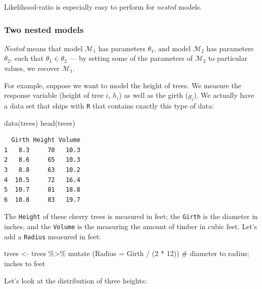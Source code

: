 \documentclass[
  letterpaper,
  DIV=11,
  numbers=noendperiod]{scrreprt}
\newenvironment{Shaded}{\begin{snugshade}}{\end{snugshade}}
\newcommand{\AttributeTok}[1]{\textcolor[rgb]{0.40,0.45,0.13}{#1}}
\newcommand{\CommentTok}[1]{\textcolor[rgb]{0.37,0.37,0.37}{#1}}
\newcommand{\DecValTok}[1]{\textcolor[rgb]{0.68,0.00,0.00}{#1}}
\newcommand{\FunctionTok}[1]{\textcolor[rgb]{0.28,0.35,0.67}{#1}}
\newcommand{\NormalTok}[1]{\textcolor[rgb]{0.00,0.23,0.31}{#1}}
\newcommand{\OtherTok}[1]{\textcolor[rgb]{0.00,0.23,0.31}{#1}}
\newcommand{\SpecialCharTok}[1]{\textcolor[rgb]{0.37,0.37,0.37}{#1}}
\begin{document}
Likelihood-ratio is especially easy to perform for \emph{nested} models.

\hypertarget{two-nested-models}{%
\subsubsection{Two nested models}\label{two-nested-models}}

\emph{Nested} means that model \(\mathcal M_1\) has parameters
\(\theta_1\), and model \(\mathcal M_2\) has parameters \(\theta_2\),
such that \(\theta_1 \in \theta_2\) --- by setting some of the
parameters of \(\mathcal M_2\) to particular values, we recover
\(\mathcal M_1\).

For example, suppose we want to model the height of trees. We measure
the response variable (height of tree \(i\), \(h_i\)) as well as the
girth (\(g_i\)). We actually have a data set that ships with \texttt{R}
that contains exactly this type of data:

\begin{Shaded}
\begin{Highlighting}[]
\FunctionTok{data}\NormalTok{(trees)}
\FunctionTok{head}\NormalTok{(trees)}
\end{Highlighting}
\end{Shaded}

\begin{verbatim}
  Girth Height Volume
1   8.3     70   10.3
2   8.6     65   10.3
3   8.8     63   10.2
4  10.5     72   16.4
5  10.7     81   18.8
6  10.8     83   19.7
\end{verbatim}

The \texttt{Height} of these cherry trees is measured in feet; the
\texttt{Girth} is the diameter in inches, and the \texttt{Volume} is the
measuring the amount of timber in cubic feet. Let's add a
\texttt{Radius} measured in feet:

\begin{Shaded}
\begin{Highlighting}[]
\NormalTok{trees }\OtherTok{\textless{}{-}}\NormalTok{ trees }\SpecialCharTok{\%\textgreater{}\%} \FunctionTok{mutate}\NormalTok{ (}\AttributeTok{Radius =}\NormalTok{ Girth }\SpecialCharTok{/}\NormalTok{ (}\DecValTok{2} \SpecialCharTok{*} \DecValTok{12}\NormalTok{)) }\CommentTok{\# diameter to radius; inches to feet}
\end{Highlighting}
\end{Shaded}

Let's look at the distribution of three heights:
\end{document}
